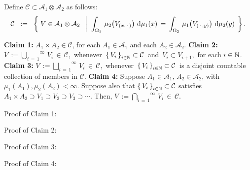 \proof
Define $\mathcal{C} \subset \mathcal{A}_{1}\otimes\mathcal{A}_{2}$ as follows:
\begin{equation*}
\mathcal{C}
\;\; := \;\;
	\left\{\;
	V \in \mathcal{A}_{1}\otimes\mathcal{A}_{2}
	\;\;\left\vert\;\;
		\int_{\Omega_{1}}\, \mu_{2}\!\left(V_{(x,\,\cdot\,)}\right) \,\textnormal{d}\mu_{1}(x)
		\, = \,
		\int_{\Omega_{2}}\, \mu_{1}\!\left(V_{(\,\cdot\,,y)}\right) \,\textnormal{d}\mu_{2}(y)
	\right.
	\;\right\}.
\end{equation*}
\vskip 0.5cm
\begin{center}
\begin{minipage}{6.5in}
\noindent
\textbf{Claim 1:}\quad
$A_{1} \times A_{2} \in \mathcal{C}$, for each $A_{1}\in\mathcal{A}_{1}$ and each $A_{2}\in\mathcal{A}_{2}$.
\vskip 0.5cm
\noindent
\textbf{Claim 2:}\quad
$V \,:= \overset{\infty}{\underset{i\,=\,1}{\bigcup}}\,V_{i}\,\in\,\mathcal{C}$,\,
whenever
\,$\left\{\,V_{i}\,\right\}_{i\in\mathbb{N}} \subset \mathcal{C}$\, and \,$V_{i} \subset V_{i+1}$,\, for each $i\in\mathbb{N}$.
\vskip 0.5cm
\noindent
\textbf{Claim 3:}\quad
$V \,:= \overset{\infty}{\underset{i\,=\,1}{\bigsqcup}}\,V_{i}\,\in\,\mathcal{C}$,\,
whenever
\,$\left\{\,V_{i}\,\right\}_{i\in\mathbb{N}} \subset \mathcal{C}$\,
is a disjoint countable collection of members in $\mathcal{C}$.
\vskip 0.5cm
\noindent
\textbf{Claim 4:}\quad
Suppose $A_{1}\in\mathcal{A}_{1}$, $A_{2}\in\mathcal{A}_{2}$, with $\mu_{1}(A_{1}), \mu_{2}(A_{2}) < \infty$.
Suppose also that
$\left\{\,V_{i}\,\right\}_{i\in\mathbb{N}} \subset \mathcal{C}$ satisfies
$A_{1}\times A_{2} \supset V_{1} \supset V_{2} \supset V_{3} \supset \cdots$.
Then, $V \,:= \overset{\infty}{\underset{i\,=\,1}{\bigcap}}\,V_{i}\,\in\,\mathcal{C}$.
\end{minipage}
\end{center}

\vskip 0.5cm
\noindent
Proof of Claim 1:\quad

\vskip 0.5cm
\noindent
Proof of Claim 2:\quad

\vskip 0.5cm
\noindent
Proof of Claim 3:\quad

\vskip 0.5cm
\noindent
Proof of Claim 4:\quad

